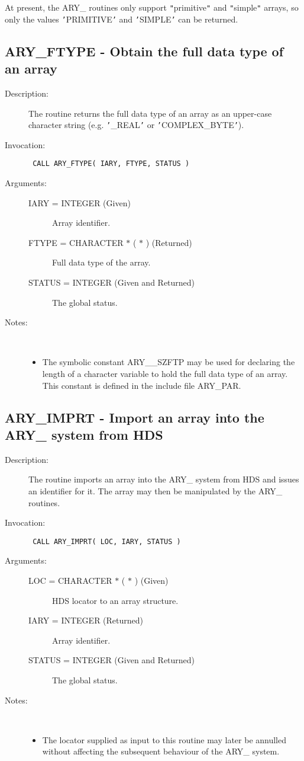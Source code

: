 \documentclass[twoside,11pt]{article}
\newcommand{\xlabel}[1]{}
\newlength{\sstbannerlength}
\newlength{\sstcaptionlength}
\newlength{\sstexampleslength}
\newlength{\sstexampleswidth}
\newcommand{\sstroutine}[3]{
   \goodbreak
   \rule{\textwidth}{0.5mm}
   \vspace{-7ex}
   \newline
   \settowidth{\sstbannerlength}{{\Large {\bf #1}}}
   \setlength{\sstcaptionlength}{\textwidth}
   \setlength{\sstexampleslength}{\textwidth}
   \addtolength{\sstbannerlength}{0.5em}
   \addtolength{\sstcaptionlength}{-2.0\sstbannerlength}
   \addtolength{\sstcaptionlength}{-5.0pt}
   \settowidth{\sstexampleswidth}{{\bf Examples:}}
   \addtolength{\sstexampleslength}{-\sstexampleswidth}
   \parbox[t]{\sstbannerlength}{\flushleft{\Large {\bf #1}}}
   \parbox[t]{\sstcaptionlength}{\center{\Large #2}}
   \parbox[t]{\sstbannerlength}{\flushright{\Large {\bf #1}}}
   \begin{description}
      #3
   \end{description}
}
\newcommand{\sstdescription}[1]{\item[Description:] #1}
\newcommand{\sstinvocation}[1]{\item[Invocation:]\hspace{0.4em}{\tt #1}}
\newcommand{\sstarguments}[1]{
   \item[Arguments:] \mbox{} \\
   \vspace{-3.5ex}
   \begin{description}
      #1
   \end{description}
}
\newcommand{\sstsubsection}[1]{ \item[{#1}] \mbox{} \\}
\newcommand{\sstnotes}[1]{\item[Notes:] \mbox{} \\[1.3ex] #1}
\newcommand{\sstitemlist}[1]{
  \mbox{} \\
  \vspace{-3.5ex}
  \begin{itemize}
     #1
  \end{itemize}
}
\newcommand{\sstitem}{\item}
\newcommand{\ssttt}{\tt}
\renewcommand{\sstroutine}[3]{
      \subsection{#1\xlabel{#1}-\label{#1}#2}
      \begin{description}
         #3
      \end{description}
   }
\renewcommand{\sstdescription}[1]{\item[Description:]
      \begin{description}
         #1
      \end{description}
   }
\renewcommand{\sstinvocation}[1]{\item[Invocation:]
      \begin{description}
         {\ssttt #1}
      \end{description}
   }
\renewcommand{\sstarguments}[1]{
      \item[Arguments:]
      \begin{description}
         #1
      \end{description}
   }
\renewcommand{\sstsubsection}[1]{\item[{#1}]}
\renewcommand{\sstnotes}[1]{\item[Notes:]
      \begin{description}
         #1
      \end{description}
   }
\newcommand{\sstitemlist}[1]{
      \begin{itemize}
         #1
      \end{itemize}
   }
\begin{document}
\begin{eqn*}
{{{         \sstitem
         At present, the ARY\_ routines only support {\tt "}primitive{\tt "} and
         {\tt "}simple{\tt "} arrays, so only the values {\tt '}PRIMITIVE{\tt '} and {\tt '}SIMPLE{\tt '} can
         be returned.
      }
   }
}
\sstroutine{
   ARY\_FTYPE
}{
   Obtain the full data type of an array
}{
   \sstdescription{
      The routine returns the full data type of an array as an
      upper-case character string (e.g. {\tt '}\_REAL{\tt '} or {\tt '}COMPLEX\_BYTE{\tt '}).
   }
   \sstinvocation{
      CALL ARY\_FTYPE( IARY, FTYPE, STATUS )
   }
   \sstarguments{
      \sstsubsection{
         IARY = INTEGER (Given)
      }{
         Array identifier.
      }
      \sstsubsection{
         FTYPE = CHARACTER $*$ ( $*$ ) (Returned)
      }{
         Full data type of the array.
      }
      \sstsubsection{
         STATUS = INTEGER (Given and Returned)
      }{
         The global status.
      }
   }
   \sstnotes{
      \sstitemlist{

         \sstitem
         The symbolic constant ARY\_\_SZFTP may be used for declaring the
         length of a character variable to hold the full data type of an
         array. This constant is defined in the include file ARY\_PAR.
      }
   }
}
\sstroutine{
   ARY\_IMPRT
}{
   Import an array into the ARY\_ system from HDS
}{
   \sstdescription{
      The routine imports an array into the ARY\_ system from HDS and
      issues an identifier for it. The array may then be manipulated by
      the ARY\_ routines.
   }
   \sstinvocation{
      CALL ARY\_IMPRT( LOC, IARY, STATUS )
   }
   \sstarguments{
      \sstsubsection{
         LOC = CHARACTER $*$ ( $*$ ) (Given)
      }{
         HDS locator to an array structure.
      }
      \sstsubsection{
         IARY = INTEGER (Returned)
      }{
         Array identifier.
      }
      \sstsubsection{
         STATUS = INTEGER (Given and Returned)
      }{
         The global status.
      }
   }
   \sstnotes{
      \sstitemlist{

         \sstitem
         The locator supplied as input to this routine may later be
         annulled without affecting the subsequent behaviour of the ARY\_
         system.

}}}
\end{eqn*}
\end{document}
